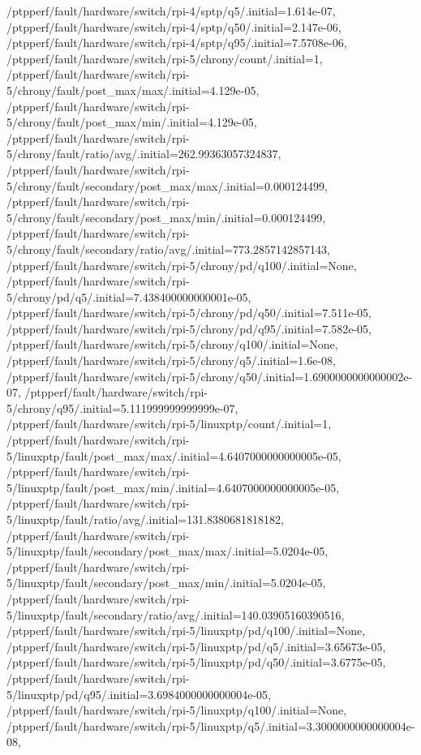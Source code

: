 {    /ptpperf/fault/hardware/switch/rpi-4/sptp/q5/.initial=1.614e-07,
    /ptpperf/fault/hardware/switch/rpi-4/sptp/q50/.initial=2.147e-06,
    /ptpperf/fault/hardware/switch/rpi-4/sptp/q95/.initial=7.5708e-06,
    /ptpperf/fault/hardware/switch/rpi-5/chrony/count/.initial=1,
    /ptpperf/fault/hardware/switch/rpi-5/chrony/fault/post_max/max/.initial=4.129e-05,
    /ptpperf/fault/hardware/switch/rpi-5/chrony/fault/post_max/min/.initial=4.129e-05,
    /ptpperf/fault/hardware/switch/rpi-5/chrony/fault/ratio/avg/.initial=262.99363057324837,
    /ptpperf/fault/hardware/switch/rpi-5/chrony/fault/secondary/post_max/max/.initial=0.000124499,
    /ptpperf/fault/hardware/switch/rpi-5/chrony/fault/secondary/post_max/min/.initial=0.000124499,
    /ptpperf/fault/hardware/switch/rpi-5/chrony/fault/secondary/ratio/avg/.initial=773.2857142857143,
    /ptpperf/fault/hardware/switch/rpi-5/chrony/pd/q100/.initial=None,
    /ptpperf/fault/hardware/switch/rpi-5/chrony/pd/q5/.initial=7.438400000000001e-05,
    /ptpperf/fault/hardware/switch/rpi-5/chrony/pd/q50/.initial=7.511e-05,
    /ptpperf/fault/hardware/switch/rpi-5/chrony/pd/q95/.initial=7.582e-05,
    /ptpperf/fault/hardware/switch/rpi-5/chrony/q100/.initial=None,
    /ptpperf/fault/hardware/switch/rpi-5/chrony/q5/.initial=1.6e-08,
    /ptpperf/fault/hardware/switch/rpi-5/chrony/q50/.initial=1.6900000000000002e-07,
    /ptpperf/fault/hardware/switch/rpi-5/chrony/q95/.initial=5.111999999999999e-07,
    /ptpperf/fault/hardware/switch/rpi-5/linuxptp/count/.initial=1,
    /ptpperf/fault/hardware/switch/rpi-5/linuxptp/fault/post_max/max/.initial=4.6407000000000005e-05,
    /ptpperf/fault/hardware/switch/rpi-5/linuxptp/fault/post_max/min/.initial=4.6407000000000005e-05,
    /ptpperf/fault/hardware/switch/rpi-5/linuxptp/fault/ratio/avg/.initial=131.8380681818182,
    /ptpperf/fault/hardware/switch/rpi-5/linuxptp/fault/secondary/post_max/max/.initial=5.0204e-05,
    /ptpperf/fault/hardware/switch/rpi-5/linuxptp/fault/secondary/post_max/min/.initial=5.0204e-05,
    /ptpperf/fault/hardware/switch/rpi-5/linuxptp/fault/secondary/ratio/avg/.initial=140.03905160390516,
    /ptpperf/fault/hardware/switch/rpi-5/linuxptp/pd/q100/.initial=None,
    /ptpperf/fault/hardware/switch/rpi-5/linuxptp/pd/q5/.initial=3.65673e-05,
    /ptpperf/fault/hardware/switch/rpi-5/linuxptp/pd/q50/.initial=3.6775e-05,
    /ptpperf/fault/hardware/switch/rpi-5/linuxptp/pd/q95/.initial=3.6984000000000004e-05,
    /ptpperf/fault/hardware/switch/rpi-5/linuxptp/q100/.initial=None,
    /ptpperf/fault/hardware/switch/rpi-5/linuxptp/q5/.initial=3.3000000000000004e-08,
}
